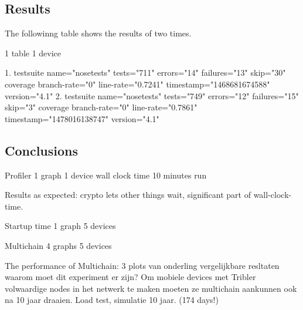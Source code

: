 \subsection{Results}
The followinng table shows the results of two times.

1 table
1 device

1.
testsuite name="nosetests" tests="711" errors="14" failures="13" skip="30"
coverage branch-rate="0" line-rate="0.7241" timestamp="1468681674588" version="4.1"
2.
testsuite name="nosetests" tests="749" errors="12" failures="15" skip="3"
coverage branch-rate="0" line-rate="0.7861" timestamp="1478016138747" version="4.1"

\subsection{Conclusions}







Profiler
1 graph
1 device
wall clock time
10 minutes run

Results as expected: crypto lets other things wait, significant part of wall-clock-time.



Startup time
1 graph
5 devices


Multichain
4 graphs
5 devices

The performance of Multichain:
3 plots van onderling vergelijkbare resltaten
waarom moet dit experiment er zijn?
Om mobiele devices met Tribler volwaardige nodes in het netwerk te maken moeten ze multichain aankunnen ook na 10 jaar draaien.
Load test, simulatie 10 jaar. (174 days!)
